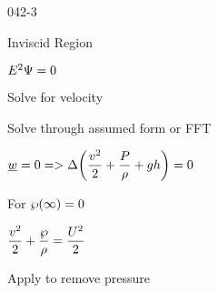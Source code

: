 \begin{mitframe}{042-3}
\begin{listone}
\item Inviscid Region
			\begin{listtwo}
            \item $\energy^2\streamfunc=0$
            			\begin{listthree}
                        \item Solve for velocity
                        \item Solve through assumed form or FFT
                        \end{listthree}           
            \item $\vort=0=>\iipf\bigg(\dfrac{\vvel^2}{2}+\dfrac{\p}{\dens}+\grav\heattranscoeff\bigg)=0$
           					\begin{listthree}
                            \item For $\dynpress(\infty)=0$
                           					\begin{listfour}
                                            \item $\dfrac{\vvel^2}{2}+\dfrac{\dynpress}{\dens}=\dfrac{\uvel^2}{2}$
                                            
                                            \end{listfour}
                          \item Apply to remove pressure
                          \end{listthree}
            \end{listtwo}
\end{listone}            
\end{mitframe}